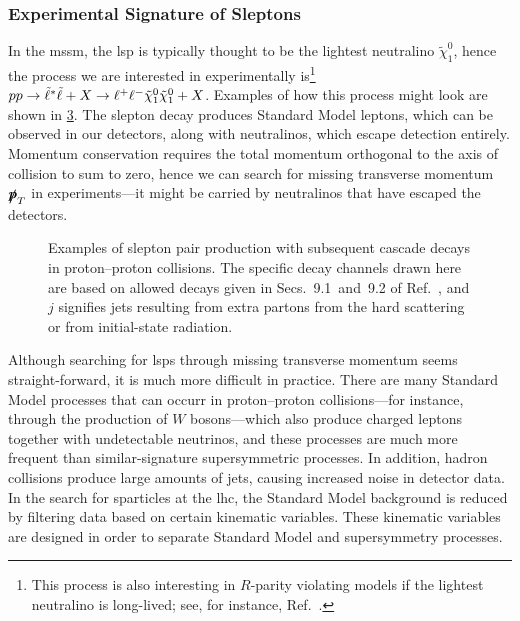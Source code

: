 \subsubsection{Experimental Signature of Sleptons}
In the \gls{mssm}, the \gls{lsp} is typically thought to be the lightest neutralino $\tilde\chi_1^0$, hence the process we are interested in experimentally is\footnote{This process is also interesting in $R$-parity violating models if the lightest neutralino is long-lived; see, for instance, Ref.~\cite{Cottin:2025avd}.} $pp \to \slepton^*\slepton+X \to \ell^+\ell^-\tilde\chi_1^0\tilde\chi_1^0+X$.
Examples of how this process might look are shown in \cref{fig:pp_to_neutralino}.
The slepton decay produces Standard Model leptons, which can be observed in our detectors, along with neutralinos, which escape detection entirely.
Momentum conservation requires the total momentum orthogonal to the axis of collision to sum to zero, hence we can search for missing transverse momentum $\vec{\slashed{p}}_T$ in experiments---it might be carried by neutralinos that have escaped the detectors.

\begin{figure}
    \centering
    \begin{subfigure}[b]{0.35\linewidth}
        \centering
        \caption{}
        \label{fig:pp_to_neutralino_simple}
    \end{subfigure}
    \begin{subfigure}[b]{0.6\linewidth}
        \centering
        \caption{}
        \label{fig:pp_to_neutralino_cascade}
    \end{subfigure}
    \caption{Examples of slepton pair production with subsequent cascade decays in proton--proton collisions. The specific decay channels drawn here are based on allowed decays given in Secs.~9.1~and~9.2 of Ref.~\cite{Martin:1997ns}, and $j$ signifies jets resulting from extra partons from the hard scattering or from initial-state radiation.}
    \label{fig:pp_to_neutralino}
\end{figure}

Although searching for \glspl{lsp} through missing transverse momentum seems straight-forward, it is much more difficult in practice.
There are many Standard Model processes that can occurr in proton--proton collisions---for instance, through the production of $W$ bosons---which also produce charged leptons together with undetectable neutrinos, and these processes are much more frequent than similar-signature supersymmetric processes.
In addition, hadron collisions produce large amounts of jets, causing increased noise in detector data.
In the search for sparticles at the \gls{lhc}, the Standard Model background is reduced by filtering data based on certain kinematic variables.
These kinematic variables are designed in order to separate Standard Model and supersymmetry processes.

